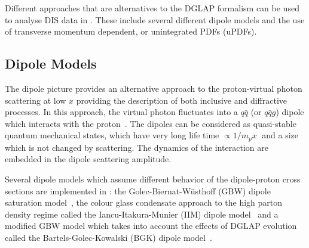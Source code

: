 

Different approaches that are alternatives to the DGLAP formalism can be used to analyse DIS data in \fitter.
These include several different dipole models and the use of 
transverse momentum dependent, or unintegrated PDFs (uPDFs).

\subsection{Dipole Models}

The dipole picture provides an alternative approach to the proton-virtual photon
 scattering at low $x$ providing the description of both inclusive and 
diffractive processes.
 In this approach, the virtual photon fluctuates into a $q\bar q$ (or $q\bar q g$) 
 dipole which interacts with the proton~\cite{NNZ:91}.  
The dipoles can be considered as quasi-stable quantum mechanical states, which have very long 
life time $\propto 1/m_p x\;$ and a size which is not changed by scattering.
The dynamics of the interaction are embedded in the dipole scattering amplitude.


Several dipole models which assume different behavior of the dipole-proton 
cross sections are implemented in \fitter:
the Golec-Biernat-W\"usthoff (GBW)
dipole saturation model~\cite{Golec-Biernat:1998js},
the colour glass condensate approach to the high parton density 
regime called the Iancu-Itakura-Munier (IIM) dipole model~\cite{Iancu:2003ge} and 
a modified GBW model which takes into account the effects of  
DGLAP evolution called the Bartels-Golec-Kowalski (BGK) dipole model~\cite{Bartels:2002cj}.

